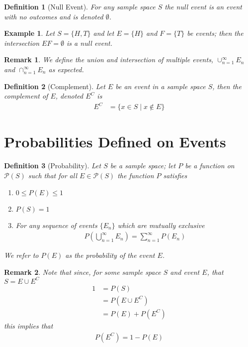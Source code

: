 \documentclass[11pt, oneside]{book}   	%
\newtheorem{definition}{Definition}[chapter]
\newtheorem{example}{Example}[chapter]
\newtheorem{remark}{Remark}[chapter]
\begin{document}
\begin{spacing}{1.618}
\begin{definition}[Null Event]
	For any sample space $S$ the null event is an event with no outcomes and is denoted $\emptyset$.
\end{definition}

\begin{example}
	Let $S=\{H, T\}$ and let $E=\{H\}$ and $F=\{T\}$ be events; then the intersection $EF=\emptyset$ is a null event. 
\end{example}

\begin{remark}
	We define the union and intersection of multiple events, $\cup_{n=1}^\infty E_n$ and $\cap_{n=1}^\infty E_n$ as expected. 
\end{remark}

\begin{definition}[Complement]
	Let $E$ be an event in a sample space $S$, then the complement of $E$, denoted $E^C$ is 
	\begin{alignat}{4}
		E^C&=\{x\in S\mid x\not\in E\}
	\end{alignat}
\end{definition}

\section{Probabilities Defined on Events}

\begin{definition}[Probability]
	Let $S$ be a sample space; let $P$ be a function on $\mathcal{P}(S)$ such that for all $E\in\mathcal{P}(S)$ the function $P$ satisfies
	\begin{enumerate}
		\item $0\leq P(E)\leq 1$
		\item $P(S)=1$
		\item For any sequence of events $\{E_n\}$ which are mutually exclusive 
			\begin{alignat}{4}
				P\left(\bigcup_{n=1}^\infty E_n\right)=\sum_{n=1}^\infty P(E_n)
			\end{alignat}
	\end{enumerate}
	We refer to $P(E)$ as the probability of the event $E$. 
\end{definition}

\begin{remark}
	Note that since, for some sample space $S$ and event $E$, that $S=E\cup E^C$ 
	\begin{alignat}{4}
		1&=P(S) \\
			&=P\left(E\cup E^C\right) \\
			&=P(E)+P\left(E^C\right)
	\end{alignat}
	this implies that
	\begin{alignat}{4}
		P\left(E^C\right)=1-P(E)
	\end{alignat}
\end{remark}


\end{spacing}
\end{document}
